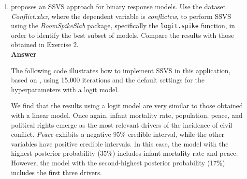 \begin{enumerate}[leftmargin=*]
\begin{tcolorbox}[enhanced,width=4.67in,center upper,
	fontupper=\large\bfseries,drop shadow southwest,sharp corners]
	\textit{R code. Application: Drivers of civil conflict in the post-Cold War era using a linear model}
	\begin{VF}
		\begin{lstlisting}[language=R]
rm(list = ls())
set.seed(010101)
Data <- read.csv("https://raw.githubusercontent.com/BEsmarter-consultancy/BSTApp/refs/heads/master/DataApp/Conflict.csv", sep = ",", header = TRUE, quote = "")

# Scale regressors
W <- as.matrix(scale(Data[, -c(1, 2)]))
niter <- 15000
y <- unlist(Data[, 2])

# Linear model
SSBoomLinear <- lm.spike(y ~ W, niter = niter)
Models <- SSBoomLinear$beta != 0
PIP <- colMeans(SSBoomLinear$beta != 0)
# Convert the logical matrix to a data frame and then to a tibble
df <- as.data.frame(Models); df_tbl <- as_tibble(df)
# Count identical rows
row_counts <- df_tbl %>% count(across(everything()), name = "frequency") %>% arrange(desc(frequency))
colnames(W)
# Get indices of best model
for(l in 1:5) {
	print(which(row_counts[l,] == 1))
	print(row_counts[l, dim(row_counts)[2]]/niter)
}
# Coefficients
SummarySS <- summary(coda::mcmc(SSBoomLinear$beta))
SummarySS
\end{lstlisting}
	\end{VF}
\end{tcolorbox} 


\item \cite{tuchler2008bayesian} proposes an SSVS approach for binary response models. Use the dataset \textit{Conflict.xlsx}, where the dependent variable is \textit{conflictcw}, to perform SSVS using the \textit{BoomSpikeSlab} package, specifically the \texttt{logit.spike} function, in order to identify the best subset of models. Compare the results with those obtained in Exercise 2.\\

\textbf{Answer}

The following code illustrates how to implement SSVS in this application, based on \cite{jetter2022postcold}, using 15,000 iterations and the default settings for the hyperparameters with a logit model. 

We find that the results using a logit model are very similar to those obtained with a linear model. Once again, infant mortality rate, population, peace, and political rights emerge as the most relevant drivers of the incidence of civil conflict. \textit{Peace} exhibits a negative 95\% credible interval, while the other variables have positive credible intervals. In this case, the model with the highest posterior probability (35\%) includes infant mortality rate and peace. However, the model with the second-highest posterior probability (17\%) includes the first three drivers.


\end{enumerate}

